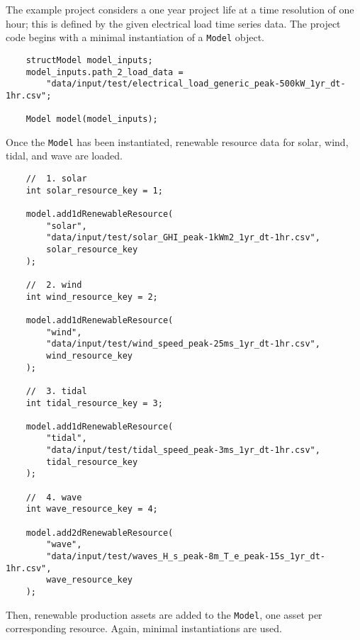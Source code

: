\documentclass[12pt, letterpaper]{report}
\begin{document}
The example project considers a one year project life at a time resolution of one hour; this is defined by the given electrical load time series data. The project code begins with a minimal instantiation of a \texttt{Model} object.

\begin{verbatim}
    structModel model_inputs;
    model_inputs.path_2_load_data =
        "data/input/test/electrical_load_generic_peak-500kW_1yr_dt-1hr.csv";
    
    Model model(model_inputs);
\end{verbatim}

\noindent Once the \texttt{Model} has been instantiated, renewable resource data for solar, wind, tidal, and wave are loaded.

\newpage
\begin{verbatim}
    //  1. solar
    int solar_resource_key = 1;
     
    model.add1dRenewableResource(
        "solar",
        "data/input/test/solar_GHI_peak-1kWm2_1yr_dt-1hr.csv",
        solar_resource_key
    );
    
    //  2. wind
    int wind_resource_key = 2;
     
    model.add1dRenewableResource(
        "wind",
        "data/input/test/wind_speed_peak-25ms_1yr_dt-1hr.csv",
        wind_resource_key
    );
    
    //  3. tidal
    int tidal_resource_key = 3;
     
    model.add1dRenewableResource(
        "tidal",
        "data/input/test/tidal_speed_peak-3ms_1yr_dt-1hr.csv",
        tidal_resource_key
    );
    
    //  4. wave
    int wave_resource_key = 4;
    
    model.add2dRenewableResource(
        "wave",
        "data/input/test/waves_H_s_peak-8m_T_e_peak-15s_1yr_dt-1hr.csv",
        wave_resource_key
    );
\end{verbatim}

\noindent Then, renewable production assets are added to the \texttt{Model}, one asset per corresponding resource. Again, minimal instantiations are used.
\end{document}
